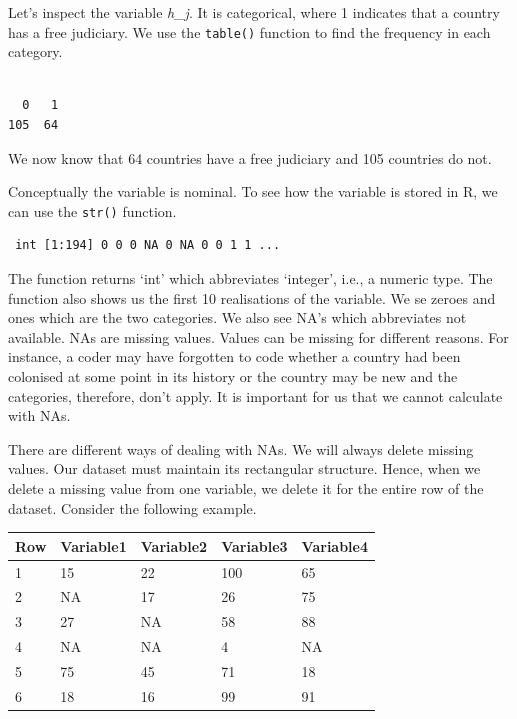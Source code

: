 \documentclass[]{book}
\newenvironment{Shaded}{\begin{snugshade}}{\end{snugshade}}
\newcommand{\KeywordTok}[1]{\textcolor[rgb]{0.13,0.29,0.53}{\textbf{#1}}}
\newcommand{\OperatorTok}[1]{\textcolor[rgb]{0.81,0.36,0.00}{\textbf{#1}}}
\newcommand{\NormalTok}[1]{#1}
\theoremstyle{definition}
\theoremstyle{definition}
\theoremstyle{definition}
\theoremstyle{remark}
\begin{document}
Let's inspect the variable \emph{h\_j}. It is categorical, where 1
indicates that a country has a free judiciary. We use the
\texttt{table()} function to find the frequency in each category.

\begin{Shaded}
\end{Shaded}

\begin{verbatim}

  0   1 
105  64 
\end{verbatim}

We now know that 64 countries have a free judiciary and 105 countries do
not.

Conceptually the variable is nominal. To see how the variable is stored
in R, we can use the \texttt{str()} function.

\begin{Shaded}
\end{Shaded}

\begin{verbatim}
 int [1:194] 0 0 0 NA 0 NA 0 0 1 1 ...
\end{verbatim}

The function returns `int' which abbreviates `integer', i.e., a numeric
type. The function also shows us the first 10 realisations of the
variable. We se zeroes and ones which are the two categories. We also
see NA's which abbreviates not available. NAs are missing values. Values
can be missing for different reasons. For instance, a coder may have
forgotten to code whether a country had been colonised at some point in
its history or the country may be new and the categories, therefore,
don't apply. It is important for us that we cannot calculate with NAs.

There are different ways of dealing with NAs. We will always delete
missing values. Our dataset must maintain its rectangular structure.
Hence, when we delete a missing value from one variable, we delete it
for the entire row of the dataset. Consider the following example.

\begin{tabular}{l|l|l|l|l}
\hline
Row & Variable1 & Variable2 & Variable3 & Variable4\\
\hline
1 & 15 & 22 & 100 & 65\\
\hline
2 & NA & 17 & 26 & 75\\
\hline
3 & 27 & NA & 58 & 88\\
\hline
4 & NA & NA & 4 & NA\\
\hline
5 & 75 & 45 & 71 & 18\\
\hline
6 & 18 & 16 & 99 & 91\\
\hline
\end{tabular}
\end{document}
